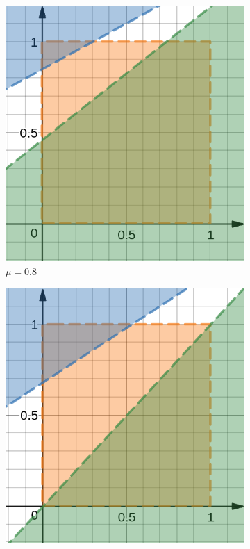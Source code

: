\begin{flushleft}
	\begin{figure}[H]
    	\centering
     	\begin{subfigure}[b]{0.22 \textwidth}
        	\centering
        	\includegraphics[width=\textwidth]{images/graf_6_1}
        	\caption{$\mu=0.8$}
         	\label{fig:y equals x}
     	\end{subfigure}
     	\hfill
     	\begin{subfigure}[b]{0.22 \textwidth}
        	\centering
        	\includegraphics[width=\textwidth]{images/graf_6_2}

\end{subfigure}
\end{figure}
\end{flushleft}
